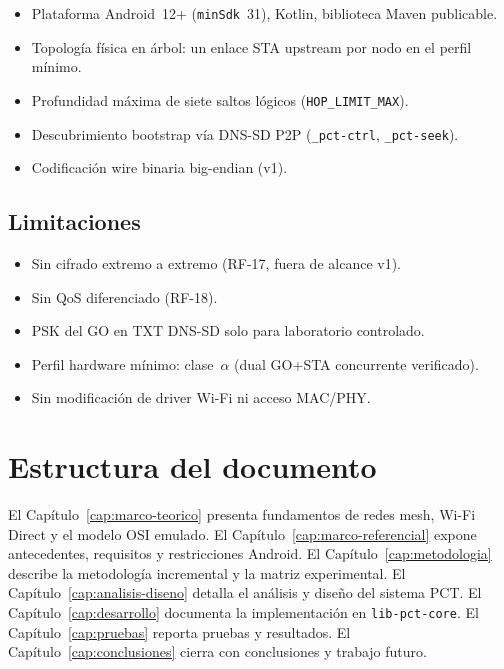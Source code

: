 \begin{itemize}
  \item Plataforma Android~12+ (\texttt{minSdk}~31), Kotlin, biblioteca Maven publicable.
  \item Topología física en árbol: un enlace STA upstream por nodo en el perfil mínimo.
  \item Profundidad máxima de siete saltos lógicos (\texttt{HOP\_LIMIT\_MAX}).
  \item Descubrimiento bootstrap vía DNS-SD P2P (\texttt{\_pct-ctrl}, \texttt{\_pct-seek}).
  \item Codificación wire binaria big-endian (v1).
\end{itemize}

\subsection{Limitaciones}

\begin{itemize}
  \item Sin cifrado extremo a extremo (RF-17, fuera de alcance v1).
  \item Sin QoS diferenciado (RF-18).
  \item PSK del GO en TXT DNS-SD solo para laboratorio controlado.
  \item Perfil hardware mínimo: clase~$\alpha$ (dual GO+STA concurrente verificado).
  \item Sin modificación de driver Wi-Fi ni acceso MAC/PHY.
\end{itemize}

\section{Estructura del documento}
\label{sec:estructura-documento}

El Capítulo~\ref{cap:marco-teorico} presenta fundamentos de redes mesh, Wi-Fi Direct y el modelo OSI emulado. El Capítulo~\ref{cap:marco-referencial} expone antecedentes, requisitos y restricciones Android. El Capítulo~\ref{cap:metodologia} describe la metodología incremental y la matriz experimental. El Capítulo~\ref{cap:analisis-diseno} detalla el análisis y diseño del sistema PCT. El Capítulo~\ref{cap:desarrollo} documenta la implementación en \texttt{lib-pct-core}. El Capítulo~\ref{cap:pruebas} reporta pruebas y resultados. El Capítulo~\ref{cap:conclusiones} cierra con conclusiones y trabajo futuro.
